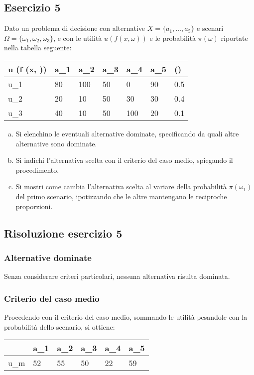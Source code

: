 \documentclass[\main/main.tex]{subfiles}
\begin{document}
\subsection{Esercizio 5}
Dato un problema di decisione con alternative $X = \{a_1, \ldots , a_5\}$ e scenari $\Omega = \{\omega_1, \omega_2, \omega_3\}$, e con le utilità $u (f (x, \omega))$ e le probabilità $\pi (\omega)$ riportate nella tabella seguente:


\begin{table}
	\begin{tabular}{|L|L|L|L|L|L||L|}
		\hline
		u (f (x, \omega)) & a_1 & a_2 & a_3 & a_4 & a_5 & \pi (\omega) \\
		\hline
		u_1               & 80  & 100 & 50  & 0   & 90  & 0.5          \\
		\hline
		u_2               & 20  & 10  & 50  & 30  & 30  & 0.4          \\
		\hline
		u_3               & 40  & 10  & 50  & 100 & 20  & 0.1          \\
		\hline
	\end{tabular}
\end{table}

\begin{enumerate}[a)]
	\item Si elenchino le eventuali alternative dominate, specificando da quali altre alternative sono dominate.
	\item Si indichi l'alternativa scelta con il criterio del caso medio, spiegando il procedimento.
	\item Si mostri come cambia l'alternativa scelta al variare della probabilità $\pi (\omega_1)$ del primo scenario, ipotizzando che le altre mantengano le reciproche proporzioni.
\end{enumerate}

\subsection{Risoluzione esercizio 5}
\subsubsection*{Alternative dominate}
Senza considerare criteri particolari, nessuna alternativa risulta dominata.

\subsubsection*{Criterio del caso medio}
Procedendo con il criterio del caso medio, sommando le utilità pesandole con la probabilità dello scenario, si ottiene:
\begin{table}
	\begin{tabular}{|L|L|L|L|L|L|}
		\hline
		    & a_1 & a_2 & a_3 & a_4 & a_5 \\
		\hline
		u_m & 52  & 55  & 50  & 22  & 59  \\
		\hline
	\end{tabular}
\end{table}
\end{document}
